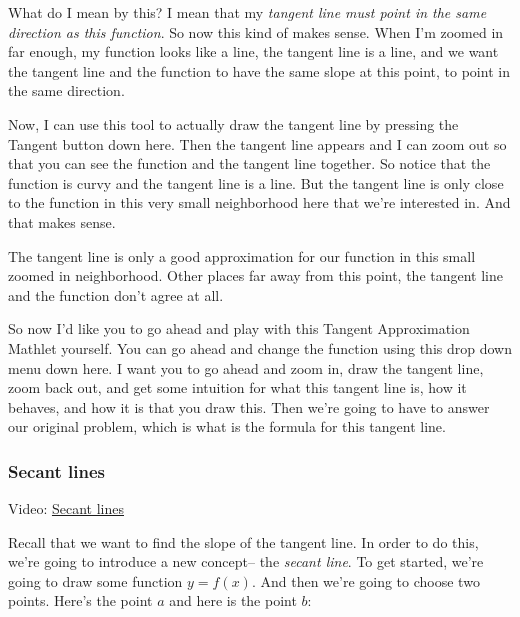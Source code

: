 \documentclass[pdftex, brazil, 12pt, twoside]{article}
\begin{document}
What do I mean by this?
I mean that my \emph{tangent line must point in the same direction
as this function}.
So now this kind of makes sense.
When I'm zoomed in far enough, my function looks like a line,
the tangent line is a line, and we
want the tangent line and the function
to have the same slope at this point,
to point in the same direction.

Now, I can use this tool to actually draw
the tangent line by pressing the Tangent button down here.
Then the tangent line appears and I can zoom out
so that you can see the function and the tangent line together.
So notice that the function is curvy
and the tangent line is a line.
But the tangent line is only close to the function
in this very small neighborhood here that we're interested in.
And that makes sense.

The tangent line is only a good approximation
for our function in this small zoomed in neighborhood.
Other places far away from this point, the tangent line
and the function don't agree at all.

So now I'd like you to go ahead and play with this Tangent
Approximation Mathlet yourself.
You can go ahead and change the function using this drop
down menu down here.
I want you to go ahead and zoom in, draw the tangent line,
zoom back out, and get some intuition for what this tangent
line is, how it behaves, and how it is that you draw this.
Then we're going to have to answer
our original problem, which is what
is the formula for this tangent line.

\subsubsection{Secant lines}
\label{u1-geometric-secant-lines}

Video: \href{https://www.youtube.com/watch?v=gUsr2VuO7Ek}{Secant lines}  

Recall that we want to find the slope of the tangent line.
In order to do this, we're going to introduce a new concept--
the \emph{secant line}.
To get started, we're going to draw
some function $y=f(x)$.
And then we're going to choose two points.
Here's the point $a$ and here is the point $b$:
\end{document}
